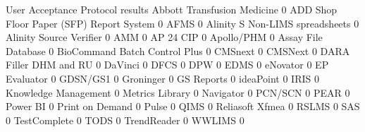 \documentclass{article}
\begin{document}
\begin{Schunk}
\begin{Soutput}
                                           User Acceptance Protocol results
  Abbott Transfusion Medicine                                             0
  ADD Shop Floor Paper (SFP) Report System                                0
  AFMS                                                                    0
  Alinity S Non-LIMS spreadsheets                                         0
  Alinity Source Verifier                                                 0
  AMM                                                                     0
  AP 24 CIP                                                               0
  Apollo/PHM                                                              0
  Assay File Database                                                     0
  BioCommand Batch Control Plus                                           0
  CMSnext                                                                 0
  CMSNext                                                                 0
  DARA Filler DHM and RU                                                  0
  DaVinci                                                                 0
  DFCS                                                                    0
  DPW                                                                     0
  EDMS                                                                    0
  eNovator                                                                0
  EP Evaluator                                                            0
  GDSN/GS1                                                                0
  Groninger                                                               0
  GS Reports                                                              0
  ideaPoint                                                               0
  IRIS                                                                    0
  Knowledge Management                                                    0
  Metrics Library                                                         0
  Navigator                                                               0
  PCN/SCN                                                                 0
  PEAR                                                                    0
  Power BI                                                                0
  Print on Demand                                                         0
  Pulse                                                                   0
  QIMS                                                                    0
  Reliasoft Xfmea                                                         0
  RSLMS                                                                   0
  SAS                                                                     0
  TestComplete                                                            0
  TODS                                                                    0
  TrendReader                                                             0
  WWLIMS                                                                  0
                                          

\end{Soutput}
\end{Schunk}
\end{document}
